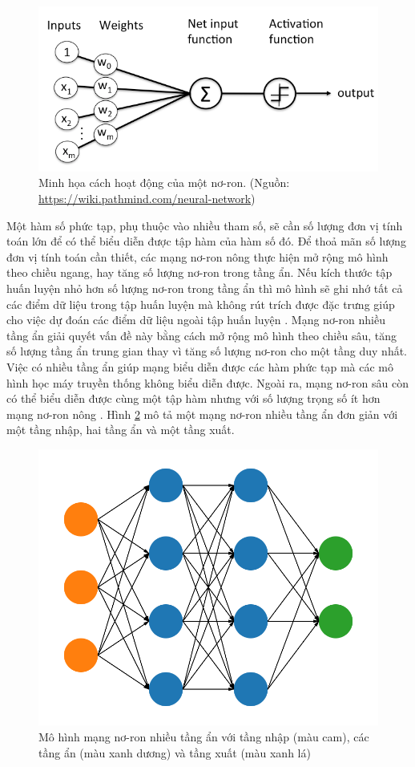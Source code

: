 \begin{figure}[htp]
	\centering
	\includegraphics[width=120 mm]{images/perceptron-node.png}
	\caption{Minh họa cách hoạt động của một nơ-ron. (Nguồn: \url{https://wiki.pathmind.com/neural-network})}
	\label{fig:perceptron-node}
\end{figure}

Một hàm số phức tạp, phụ thuộc vào nhiều tham số, sẽ cần số lượng đơn vị tính toán lớn để có thể biểu diễn được tập hàm của hàm số đó. Để thoả mãn số lượng đơn vị tính toán cần thiết, các mạng nơ-ron nông thực hiện mở rộng mô hình theo chiều ngang, hay tăng số lượng nơ-ron trong tầng ẩn. Nếu kích thước tập huấn luyện nhỏ hơn số lượng nơ-ron trong tầng ẩn thì mô hình sẽ ghi nhớ tất cả các điểm dữ liệu trong tập huấn luyện mà không rút trích được đặc trưng giúp cho việc dự đoán các điểm dữ liệu ngoài tập huấn luyện . Mạng nơ-ron nhiều tầng ẩn giải quyết vấn đề này bằng cách mở rộng mô hình theo chiều sâu, tăng số lượng tầng ẩn trung gian thay vì tăng số lượng nơ-ron cho một tầng duy nhất. Việc có nhiều tầng ẩn giúp mạng biểu diễn được các hàm phức tạp mà các mô hình học máy truyền thống không biểu diễn được. Ngoài ra, mạng nơ-ron sâu còn có thể biểu diễn được cùng một tập hàm nhưng với số lượng trọng số ít hơn mạng nơ-ron nông \cite{bengio2009learning}. Hình \ref{fig:dnn} mô tả một mạng nơ-ron nhiều tầng ẩn đơn giản với một tầng nhập, hai tầng ẩn và một tầng xuất.

\begin{figure}[H]
	\centering
	\includegraphics[width=80 mm]{images/dnn.png}
	\caption{Mô hình mạng nơ-ron nhiều tầng ẩn với tầng nhập (màu cam), các tầng ẩn (màu xanh dương) và tầng xuất (màu xanh lá)}
	\label{fig:dnn}
\end{figure}

